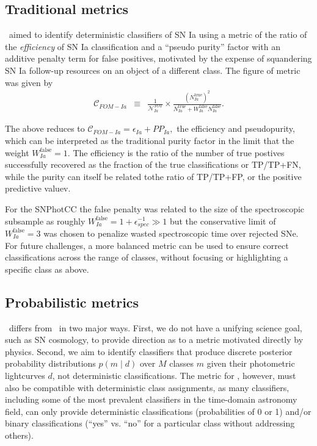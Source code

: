 \subsection{Traditional metrics}
\label{sec:past}


\snphotcc\ aimed to identify deterministic classifiers of SN Ia using a metric of the ratio of the \textit{efficiency} of SN Ia classification and a ``pseudo purity'' factor with an additive penalty term for false positives, motivated by the expense of squandering SN Ia follow-up resources on an object of a different class.
The figure of metric was given by
\begin{eqnarray}
  \label{eq:snphotcc}
  \mathcal{C}_{FOM-Ia} &\equiv& \frac{1}{\mathcal{N}_{Ia}^{TOT}}\times \frac{(N_{Ia}^{\mathrm{true}})^2}{N_{Ia}^\mathrm{true}+W_{Ia}^\mathrm{false}N_{Ia}^\mathrm{false}}.
\end{eqnarray}

The above reduces to $\mathcal{C}_{FOM-Ia}  = \epsilon_{Ia} + PP_{Ia},$ the efficiency and pseudopurity, which can be interpreted as the traditional purity factor in the limit that the weight $W_{Ia}^\mathrm{false} = 1$.
The efficiency is the ratio of the number of true postives successfully recovered as the fraction of the true classifications or TP/TP+FN, while the purity can itself be related tothe ratio of TP/TP+FP, or the positive predictive valuev.

For the SNPhotCC the false penalty was related to the size of the spectroscopic subsample as roughly $W_{Ia}^\mathrm{false} = 1 + \epsilon_{spec}^{-1} \gg 1$ but the conservative limit of $W_{Ia}^\mathrm{false} = 3$ was chosen to penalize wasted spectroscopic time over rejected SNe.
For future challenges, a more balanced metric can be used to ensure correct classifications across the range of classes, without focusing or highlighting a specific class as above.


\subsection{Probabilistic metrics}
\label{sec:metrics}

\plasticc\ differs from \snphotcc\ in two major ways.
First, we do not have a unifying science goal, such as SN cosmology, to provide direction as to a metric motivated directly by physics.
Second, we aim to identify classifiers that produce discrete posterior probability distributions $p(m \mid d)$ over $M$ classes $m$ given their photometric lightcurves $d$, not deterministic classifications.
The metric for \plasticc, however, must also be compatible with deterministic class assignments, as many classifiers, including some of the most prevalent classifiers in the time-domain astronomy field, can only provide deterministic classifications (probabilities of 0 or 1) and/or binary classifications (``yes'' vs. ``no'' for a particular class without addressing others).

